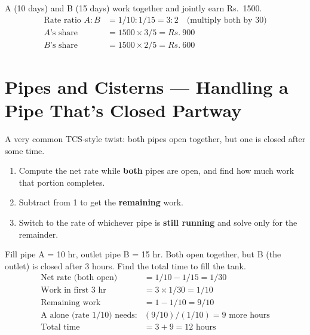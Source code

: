 \documentclass[11pt]{article}
\begin{document}
\begin{examplebox}
A (10 days) and B (15 days) work together and jointly earn Rs.~1500.
\begin{align*}
\text{Rate ratio } A:B &= 1/10 : 1/15 = 3:2 \quad \text{(multiply both by 30)} \\
A\text{'s share} &= 1500 \times 3/5 = Rs.~900 \\
B\text{'s share} &= 1500 \times 2/5 = Rs.~600
\end{align*}
\end{examplebox}

\section{Pipes and Cisterns --- Handling a Pipe That's Closed Partway}
A very common TCS-style twist: both pipes open together, but one is closed after some time.

\begin{formulabox}[Procedure]
\begin{enumerate}[leftmargin=1.4em]
  \item Compute the net rate while \textbf{both} pipes are open, and find how much work that portion
    completes.
  \item Subtract from 1 to get the \textbf{remaining} work.
  \item Switch to the rate of whichever pipe is \textbf{still running} and solve only for the
    remainder.
\end{enumerate}
\end{formulabox}

\begin{examplebox}
Fill pipe A = 10 hr, outlet pipe B = 15 hr. Both open together, but B (the outlet) is closed after 3
hours. Find the total time to fill the tank.
\begin{align*}
\text{Net rate (both open)} &= 1/10 - 1/15 = 1/30 \\
\text{Work in first 3 hr} &= 3 \times 1/30 = 1/10 \\
\text{Remaining work} &= 1 - 1/10 = 9/10 \\
\text{A alone (rate } 1/10\text{) needs:} & (9/10)/(1/10) = 9 \text{ more hours} \\
\text{Total time} &= 3 + 9 = 12 \text{ hours}
\end{align*}
\end{examplebox}
\end{document}
